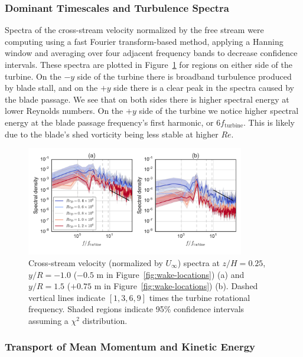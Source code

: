 \documentclass[energies,article,accept,moreauthors,pdftex,12pt,a4paper]{mdpi}
\begin{document}
\subsubsection{Dominant Timescales and Turbulence Spectra}

Spectra of the cross-stream velocity normalized by the free stream were
computing using a fast Fourier transform-based method, applying a Hanning window
and averaging over four adjacent frequency bands to decrease confidence
intervals. These spectra are plotted in Figure~\ref{fig:wake-spectra} for
regions on either side of the turbine. On the $-y$ side of the turbine there is
broadband turbulence produced by blade stall, and on the $+y$ side there is a
clear peak in the spectra caused by the blade passage. We see that on both sides
there is higher spectral energy at lower Reynolds numbers. On the $+y$ side of
the turbine we notice higher spectral energy at the blade passage frequency's
first harmonic, or $6 f_\mathrm{turbine}$. This is likely due to the blade's
shed vorticity being less stable at higher $Re$.

\begin{figure}[ht!]
\centering

\includegraphics[width=0.85\textwidth]{figures/wake_spectra}

\caption{Cross-stream velocity (normalized by $U_\infty$) spectra at $z/H=0.25$,
    $y/R=-1.0$ ($-0.5$ m in Figure~\ref{fig:wake-locations}) (a) and $y/R=1.5$
    ($+0.75$ m in Figure~\ref{fig:wake-locations}) (b). Dashed vertical lines
    indicate $[1, 3, 6, 9]$ times the turbine rotational frequency. Shaded regions
    indicate 95\% confidence intervals assuming a $\chi^2$ distribution.}

\label{fig:wake-spectra}
\end{figure}



\subsubsection{Transport of Mean Momentum and Kinetic Energy}
\end{document}
